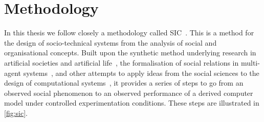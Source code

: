 

\section{Methodology}

In this thesis we follow closely a methodology called \ac{SIC}~\citep{Jones2013}. This is a method for the design of socio-technical systems from the analysis of social and organisational concepts. Built upon the synthetic method underlying research in artificial societies and artificial life~\citep{Steels1994}, the formalisation of social relations in multi-agent systems~\citep{Neville2004}, and other attempts to apply ideas from the social sciences to the design of computational systems~\citep{Edmonds2005}, it provides a series of steps to go from an observed social phenomenon to an observed performance of a derived computer model under controlled experimentation conditions. These steps are illustrated in \autoref{fig:sic}.

